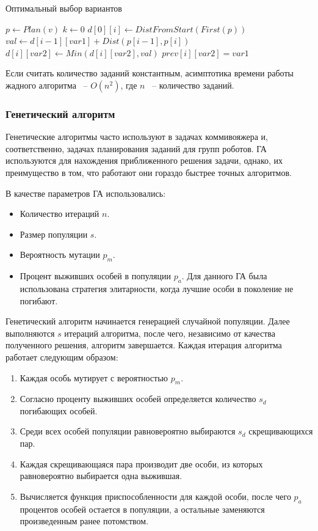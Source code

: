\documentclass[a4paper,14pt,russian]{article}
\begin{document}
\begin{algorithm}
\caption{Оптимальный выбор вариантов}\label{alg:dynamic}
\begin{algorithmic}[1]
    \State $p \gets Plan(v)$
    \State $k \gets 0$
        \State $d[0][i] \gets DistFromStart(First(p))$
    \EndFor
                \State $val \gets d[i - 1][var1] + Dist(p[i - 1], p[i])$
                    \State $d[i][var2] \gets Min(d[i][var2], val)$
                    \State $prev[i][var2] = var1$
                \EndIf
            \EndFor
        \EndFor
    \EndFor
    \State {}
\EndProcedure
\end{algorithmic}
\end{algorithm}

Если считать количество заданий константным, асимптотика времени работы жадного алгоритма ~-- $O(n^2)$, где $n$ ~-- количество заданий.


\subsubsection{Генетический алгоритм}
Генетические алгоритмы часто используют в задачах коммивояжера и, соответственно, задачах планирования заданий для групп роботов. ГА используются для нахождения приближенного решения задачи, однако, их преимущество в том, что работают они гораздо быстрее точных алгоритмов.

В качестве параметров ГА использовались:
\begin{itemize}
\item Количество итераций $n$.
\item Размер популяции $s$.
\item Вероятность мутации $p_m$.
\item Процент выживших особей в популяции $p_a$. Для данного ГА была использована стратегия элитарности, когда лучшие особи в поколение не погибают.
\end{itemize}

Генетический алгоритм начинается генерацией случайной популяции.
Далее выполняются $s$ итераций алгоритма, после чего, независимо от качества полученного решения, алгоритм завершается.
Каждая итерация алгоритма работает следующим образом:
\begin{enumerate}
\item Каждая особь мутирует с вероятностью $p_m$.
\item Согласно проценту выживших особей определяется количество $s_d$ погибающих особей.
\item Среди всех особей популяции равновероятно выбираются $s_d$ скрещивающихся пар.
\item Каждая скрещивающаяся пара производит две особи, из которых равновероятно выбирается одна выжившая.
\item Вычисляется функция приспособленности для каждой особи, после чего $p_a$ процентов особей остается в популяции, а остальные заменяются произведенным ранее потомством.
\end{enumerate}
\end{document}
